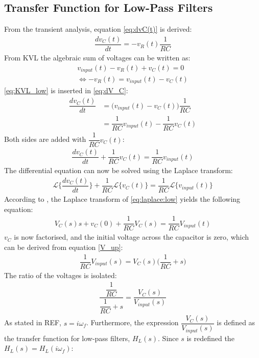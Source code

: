 \subsection{Transfer Function for Low-Pass Filters}
From the transient analysis, equation \eqref{eq:dvC(t)} is derived:
\begin{align} \label{eq:dV_C}
\dfrac{dv_C(t)}{dt}=-v_R(t)\dfrac{1}{RC}
\end{align}
From KVL the algebraic sum of voltages can be written as: 
\begin{align}
v_{input}(t)-v_{R}(t)+v_{C}(t)=0
\\
\Leftrightarrow -v_{R}(t) = v_{input}(t) - v_{C}(t) \label{eq:KVL_low}
\end{align}
\eqref{eq:KVL_low} is inserted in \eqref{eq:dV_C}:
\begin{align} 
\dfrac{dv_C(t)}{dt}&=\Big(v_{input}(t) - v_{C}(t)\Big)\dfrac{1}{RC}
\\
&=\dfrac{1}{RC}v_{input}(t) - \dfrac{1}{RC}v_{C}(t)
\end{align}
Both sides are added with $\dfrac{1}{RC}v_C(t)$:
\begin{align}
\dfrac{dv_C(t)}{dt}+\dfrac{1}{RC}v_C(t)=\dfrac{1}{RC}v_{input}(t)
\end{align}
The differential equation can now be solved using the Laplace transform:
\begin{align}\label{eq:laplace:low}\mathcal{L}\bigg\{\dfrac{dv_C(t)}{dt}\bigg\}+\dfrac{1}{RC}\mathcal{L}\Big\{v_C(t)\Big\}=\dfrac{1}{RC}\mathcal{L}\Big\{v_{input}(t)\Big\}
\end{align}
According to , the Laplace transform of \eqref{eq:laplace:low} yields the following equation:
\begin{align}
V_C(s)s+v_C(0)+\dfrac{1}{RC}V_C(s)=\dfrac{1}{RC}V_{input}(t)
\end{align} 
$v_{C}$ is now factorised, and the initial voltage across the capacitor is zero, which can be derived from equation \eqref{V_up}:
\begin{align}
\dfrac{1}{RC}V_{input}(s)=V_{C}(s)\Big(\dfrac{1}{RC}+s\Big)
\end{align} 
The ratio of the voltages is isolated:
\begin{align}
\dfrac{\dfrac{1}{RC}}{\dfrac{1}{RC}+s} = \dfrac{V_{C}(s)}{V_{input}(s)}
\end{align} 
As stated in REF, $s=i \omega_f$. Furthermore, the expression $\dfrac{V_{C}(s)}{V_{input}(s)}$ is defined as the transfer function for low-pass filters, $H_{L}(s)$. Since $s$ is redefined the $H_{L}(s)=H_{L}(i \omega_f)$:
